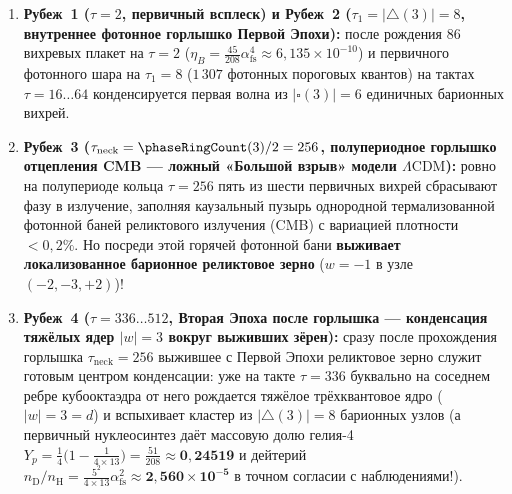 \begin{enumerate}[label=\textbf{\arabic*.},leftmargin=*]
\item \textbf{Рубеж~1 ($\tau = 2$, первичный всплеск) и Рубеж~2 ($\tau_1 = |{\triangle}(3)| = 8$, внутреннее фотонное горлышко Первой Эпохи):}
  после рождения 86 вихревых плакет на $\tau=2$ ($\eta_B = \frac{45}{208}\alpha_{\mathrm{fs}}^4 \approx 6{,}135\times 10^{-10}$) и первичного фотонного шара на $\tau_1 = 8$ ($1\,307$ фотонных пороговых квантов) на тактах $\tau = 16\dots 64$ конденсируется первая волна из $|\square(3)| = 6$ единичных барионных вихрей.
\item \textbf{Рубеж~3 ($\tau_{\mathrm{neck}} = \phaseRingCount(3)/2 = 256$, полупериодное горлышко отцепления CMB --- ложный «Большой взрыв» модели $\Lambda\mathrm{CDM}$):}
  ровно на полупериоде кольца $\tau = 256$ пять из шести первичных вихрей сбрасывают фазу в излучение, заполняя каузальный пузырь однородной термализованной фотонной баней реликтового излучения (CMB) с вариацией плотности $< 0{,}2\%$. Но посреди этой горячей фотонной бани \textbf{выживает локализованное барионное реликтовое зерно} ($w = -1$ в узле $(-2,-3,+2)$)!
\item \textbf{Рубеж~4 ($\tau = 336\dots 512$, Вторая Эпоха после горлышка --- конденсация тяжёлых ядер $|w| = 3$ вокруг выживших зёрен):}
  сразу после прохождения горлышка $\tau_{\mathrm{neck}} = 256$ выжившее с Первой Эпохи реликтовое зерно служит готовым центром конденсации: уже на такте $\tau = 336$ буквально на соседнем ребре кубооктаэдра от него рождается тяжёлое трёхквантовое ядро ($|w| = 3 = d$) и вспыхивает кластер из $|{\triangle}(3)| = 8$ барионных узлов (а первичный нуклеосинтез даёт массовую долю гелия-4 $Y_p = \frac{1}{4}\bigl(1 - \frac{1}{4\times 13}\bigr) = \frac{51}{208} \approx \mathbf{0{,}24519}$ и дейтерий $n_{\mathrm{D}}/n_{\mathrm{H}} = \frac{5^2}{4\times 13}\alpha_{\mathrm{fs}}^2 \approx \mathbf{2{,}560\times 10^{-5}}$ в точном согласии с наблюдениями!).
\end{enumerate}

